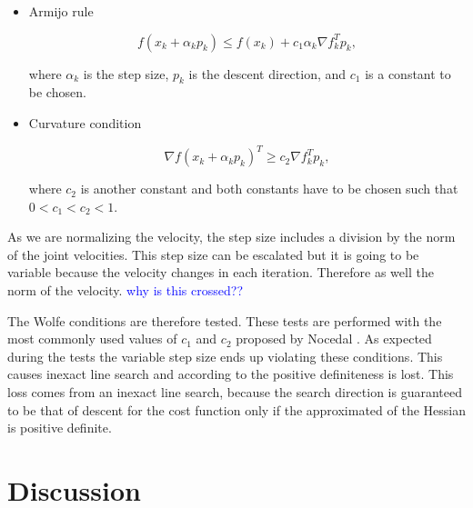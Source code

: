 \begin{itemize}
	\item Armijo rule
	
	\begin{equation}
	f(x_k +  \alpha_k p_k) \le f(x_k) + c_1 \alpha_k \nabla f_k^{T} p_k ,
 	\end{equation}
	
	where $\alpha_k $ is the step size, $p_k$ is the descent direction, and $c_1$ is a constant to be chosen.
	
	\item Curvature condition
	
	\begin{equation}
	\nabla f(x_k + \alpha_k p_k)^{T} \ge  c_2 \nabla f_k^{T} p_k  ,
	\end{equation}	
	
	where $c_2$ is another constant and both constants have to be chosen such that $ 0 < c_1 < c_2 < 1 $.
	
	
\end{itemize}





As we are normalizing the velocity, the step size includes a division by the norm of the joint velocities. This step size can be escalated but it is going to be variable because the velocity changes in each iteration. Therefore as well the norm of the velocity. 	\textcolor{blue}{why is this crossed?? }

The Wolfe conditions are therefore tested.  These tests are performed with the most commonly used values of $c_1$ and $c_2$ proposed by Nocedal \cite{Nocedal2006NO}.
As expected during the tests
the variable step size ends up violating these conditions. This causes inexact line search and according to \cite{intro_opt_design} the positive definiteness is lost. This loss comes from an inexact line search, because the search direction is guaranteed to be that of descent for the cost function only if the approximated of the Hessian is positive definite.

\section{Discussion}
\label{sec:comparison_local_minim}







